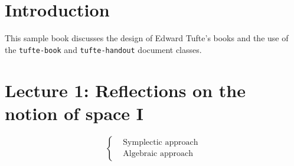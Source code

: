 \documentclass{tufte-book} %
\newcommand{\doccls}[1]{\texttt{#1}}
\numberwithin{dummy}{section}
\begin{document}

\tableofcontents %








\cleardoublepage
\chapter{Introduction} %

This sample book discusses the design of Edward Tufte's books\cite{Tufte2001,Tufte1990,Tufte1997,Tufte2006} and the use of the \doccls{tufte-book} and \doccls{tufte-handout} document classes.


\mainmatter

\chapter{Lecture 1: Reflections on the notion of space I}
$$
\left\{
\begin{aligned}
&\text{Symplectic approach}\\
&\text{Algebraic approach}
\end{aligned}
\right.
$$
\end{document}
